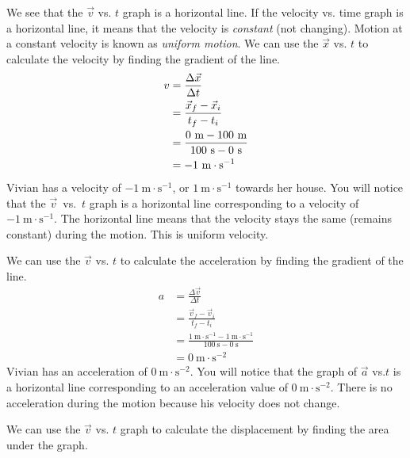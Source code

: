         \label{m38795*id70236}We see that the $\vec{v}$ vs. $t$ graph is a horizontal line. If the velocity vs. time graph is a horizontal line, it means that the velocity is \textsl{constant} (not changing). Motion at a constant velocity is known as \textsl{uniform motion}.
        \label{m38795*id70269}We can use the $\vec{x}$ vs. $t$ to calculate the velocity by finding the gradient of the line.
    \begin{align*}
    v &= \frac{\Delta \vec{x}}{\Delta t}\hfill \\ 
      &= \frac{\vec{x}_{f}-\vec{x}_{i}}{{t}_{f}-{t}_{i}}\\ 
      &= \frac{0~\text{m}-100~\text{m}}{100~\text{s}-0~\text{s}}\hfill \\ 
      &= -1~\text{m}\ensuremath{\cdot}{\text{s}}^{-1}
      \end{align*}
        \label{m38795*id70472}Vivian has a velocity of $-1~\text{m}\ensuremath{\cdot}\text{s}{}^{-1}$, or $1~\text{m}\ensuremath{\cdot}\text{s}{}^{-1}$ towards her house. You will notice that the $\vec{v}$~vs.~$t$ graph is a horizontal line corresponding to a velocity of $-1~\text{m}\ensuremath{\cdot}\text{s}{}^{-1}$. The horizontal line means that the velocity stays the same (remains constant) during the motion. This is uniform velocity.\par 
        \label{m38795*id70573}We can use the $\vec{v}$ vs. $t$ to calculate the acceleration by finding the gradient of the line.  
    \begin{align*}
      a&= \frac{\Delta \vec{v}}{\Delta t}\\ 
      &= \frac{\vec{v}_{f}-\vec{v}_{i}}{{t}_{f}-{t}_{i}}\\ 
      &= \frac{1~\text{m}\ensuremath{\cdot}{\text{s}}^{-1}-1~\text{m}\ensuremath{\cdot}{\text{s}}^{-1}}{100~\text{s}-0~\text{s}}\\ 
      &= 0~\text{m}\ensuremath{\cdot}{\text{s}}^{-2}
      \end{align*}
        \label{m38795*id70807}Vivian has an acceleration of $0~\text{m}\ensuremath{\cdot}\text{s}{}^{-2}$. You will notice that the graph of $\vec{a}$ vs.$t$ is a horizontal line corresponding to an acceleration value of $0~\text{m}\ensuremath{\cdot}\text{s}{}^{-2}$. There is no acceleration during the motion because his velocity does not change.\par 
        \label{m38795*id70880}We can use the $\vec{v}$ vs. $t$ graph to calculate the displacement by finding the area under the graph.
         

